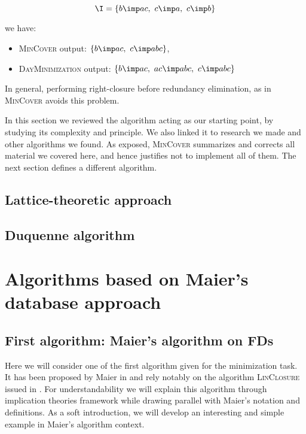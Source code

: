 \[ \I =  \{ b \imp ac, \ c \imp a, \  c \imp b \} \]

\noindent we have:
\begin{itemize}
	\item \textsc{MinCover} output: $\{ b \imp ac, \ c \imp abc \}$,
	\item \textsc{DayMinimization} output: $ \{ b \imp ac, \ ac \imp abc, \  c 
	\imp abc \}$
\end{itemize}
In general, performing right-closure before redundancy elimination, as in 
\textsc{MinCover} avoids this problem. 

\vspace{1.2em}

In this section we reviewed the algorithm acting as our starting point, by 
studying its complexity and principle. We also linked it to research we made
and other algorithms we found. As exposed, \textsc{MinCover} summarizes and 
corrects all material we covered here, and hence justifies not to implement
all of them. The next section defines a different algorithm.


\subsection{Lattice-theoretic approach}

\subsection{Duquenne algorithm}









\section{Algorithms based on Maier's database approach}

\subsection{First algorithm: Maier's algorithm on FDs}

Here we will consider one of the first algorithm given for the minimization 
task. It has been proposed by Maier in \cite{maier_theory_1983, 
	david_minimum_1980} and rely notably on the algorithm \textsc{LinClosure} 
	issued
in \cite{beeri_computational_1979}. For understandability we will explain this
algorithm through implication theories framework while drawing parallel with
Maier's notation and definitions. As a soft introduction, we will develop an
interesting and simple example in Maier's algorithm context.

